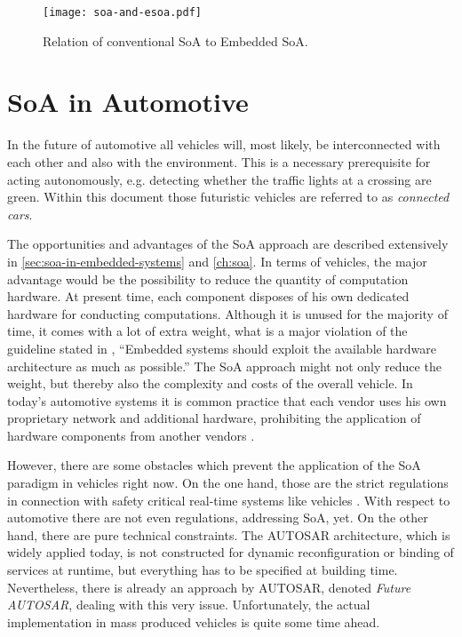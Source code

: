 \begin{figure}[!htbp]
\centering
\texttt{[image: soa-and-esoa.pdf]}
\caption{Relation of conventional SoA to Embedded SoA.}
\label{fig:soa-and-esoa}
\end{figure}







\section{SoA in Automotive}
\label{sec:soa-in-automotive}

In the future of automotive all vehicles will, most likely, be interconnected with each other and also with the environment. This is a necessary prerequisite for acting autonomously, e.g. detecting whether the traffic lights at a crossing are green. Within this document those futuristic vehicles are referred to as \emph{connected cars}.

The opportunities and advantages of the SoA approach are described extensively in \ref{sec:soa-in-embedded-systems} and \ref{ch:soa}. In terms of vehicles, the major advantage would be the possibility to reduce the quantity of computation hardware. At present time, each component disposes of his own dedicated hardware for conducting computations. Although it is unused for the majority of time, it comes with a lot of extra weight, what is a major violation of the guideline stated in \cite[p.7]{marwedel}, ``Embedded systems should exploit the available hardware architecture as much as possible.'' The SoA approach might not only reduce the weight, but thereby also the complexity and costs of the overall vehicle. In today's automotive systems it is common practice that each vendor uses his own proprietary network and additional hardware, prohibiting the application of hardware components from another vendors \cite{sommer}.

However, there are some obstacles which prevent the application of the SoA paradigm in vehicles right now. On the one hand, those are the strict regulations in connection with safety critical real-time systems like vehicles \cite{kum}. With respect to automotive there are not even regulations, addressing SoA, yet. On the other hand, there are pure technical constraints. The \mbox{AUTOSAR} architecture, which is widely applied today, is not constructed for dynamic reconfiguration or binding of services at runtime, but everything has to be specified at building time. Nevertheless, there is already an approach by \mbox{AUTOSAR}, denoted \emph{Future \mbox{AUTOSAR}}, dealing with this very issue. Unfortunately, the actual implementation in mass produced vehicles is quite some time ahead.

